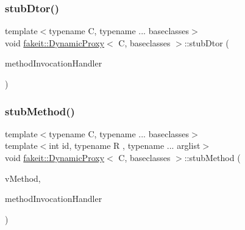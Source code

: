 \mbox{\label{structfakeit_1_1DynamicProxy_a8ab5aa831398c6ee27cbdb12ee1f15cf}} 
\subsubsection{\texorpdfstring{stubDtor()}{stubDtor()}\hspace{0.1cm}{\footnotesize\ttfamily [9/9]}}
{\footnotesize\ttfamily template$<$typename C, typename ... baseclasses$>$ \\
void \mbox{\hyperlink{structfakeit_1_1DynamicProxy}{fakeit\+::\+Dynamic\+Proxy}}$<$ C, baseclasses $>$\+::stub\+Dtor (\begin{DoxyParamCaption}\item[{\mbox{\hyperlink{structfakeit_1_1MethodInvocationHandler}{Method\+Invocation\+Handler}}$<$ void $>$ $\ast$}]{method\+Invocation\+Handler }\end{DoxyParamCaption})\hspace{0.3cm}{\ttfamily [inline]}}

\mbox{\label{structfakeit_1_1DynamicProxy_ab1a98295698cf6eed3ff04ed4b838e51}} 
\subsubsection{\texorpdfstring{stubMethod()}{stubMethod()}\hspace{0.1cm}{\footnotesize\ttfamily [1/9]}}
{\footnotesize\ttfamily template$<$typename C, typename ... baseclasses$>$ \\
template$<$int id, typename R , typename ... arglist$>$ \\
void \mbox{\hyperlink{structfakeit_1_1DynamicProxy}{fakeit\+::\+Dynamic\+Proxy}}$<$ C, baseclasses $>$\+::stub\+Method (\begin{DoxyParamCaption}\item[{R(C\+::$\ast$)(arglist...)}]{v\+Method,  }\item[{\mbox{\hyperlink{structfakeit_1_1MethodInvocationHandler}{Method\+Invocation\+Handler}}$<$ R, arglist... $>$ $\ast$}]{method\+Invocation\+Handler }\end{DoxyParamCaption})\hspace{0.3cm}{\ttfamily [inline]}}

